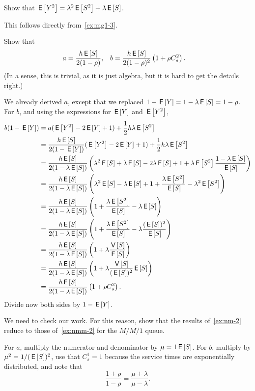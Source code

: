 \begin{extra}
  Show that $\E{Y^2} = \lambda^2 \E{S^2} + \lambda \E S$. 
\begin{solution}
This follows directly from~\cref{ex:mg1-3}.
\end{solution}
\end{extra}

\begin{exercise}
Show that 
\begin{align*}
  a &= \frac{h \E S}{2(1-\rho)}, &
  b &= \frac{h \E S}{2(1-\rho)^2} \left( 1+ \rho C_s^2\right).
\end{align*}
(In a sense, this is trivial, as it is just algebra, but it is hard to get the details right.)
\begin{solution}
  We already derived $a$, except that we replaced $1-\E Y= 1-\lambda \E S = 1-\rho$. 
For $b$, and using the expressions for $\E Y$ and $\E{Y^2}$, 
\begin{align*}
b(1-\E Y) &= a(\E{Y^2} - 2 \E Y + 1) + \frac 12 h \lambda \E{S^2} \\
&= \frac{h \E S}{2(1-\E Y)} (\E{Y^2} - 2 \E Y + 1) + \frac 12 h \lambda \E{S^2} \\
&= \frac{h \E S}{2(1-\lambda \E S)} \left(\lambda^2 \E{S} + \lambda \E S - 2 \lambda \E S + 1 +  \lambda \E{S^2}\frac{1-\lambda \E S}{\E S}\right) \\
&= \frac{h \E S}{2(1-\lambda \E S)} \left(\lambda^2 \E{S} - \lambda \E S + 1 +  \frac{\lambda \E{S^2}}{\E S} - \lambda^2 \E{S^2}\right) \\
&= \frac{h \E S}{2(1-\lambda \E S)} \left(1+ \frac{\lambda \E{S^2}}{\E S }  - \lambda \E S \right) \\
&= \frac{h \E S}{2(1-\lambda \E S)} \left( 1+ \frac{\lambda \E{S^2}}{\E S }  - \lambda \frac{(\E S)^2}{\E S}\right) \\
&= \frac{h \E S}{2(1-\lambda \E S)} \left( 1+ \lambda \frac{\V{S}}{\E S }\right)\\
&= \frac{h \E S}{2(1-\lambda \E S)} \left( 1+ \lambda \frac{\V{S}}{(\E S)^2 } \E S\right)\\
&= \frac{h \E S}{2(1-\lambda \E S)} \left( 1+ \rho C_s^2\right).
\end{align*}
Divide now both sides by $1-\E Y$. 
\end{solution}
\end{exercise}

\begin{extra}
We need to check our work.  For this reason, show that the results of~\cref{ex:nm-2} reduce to those of~\cref{ex:nmm-2} for the $M/M/1$ queue. 
\begin{solution}
  For $a$, multiply the numerator and denominator by $\mu=1\E S$.
  For $b$, multiply by $\mu^2 = 1/(\E S)^2$, use that $C_s^1=1$ because the service times are exponentially distributed, and note that
  \begin{equation*}
    \frac{1+\rho}{1-\rho} = \frac{\mu + \lambda}{\mu-\lambda}.
  \end{equation*}
\end{solution}
\end{extra}

